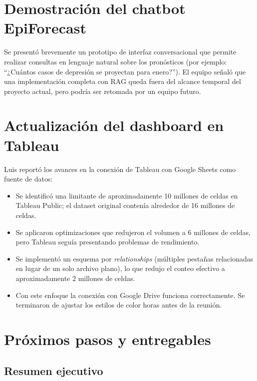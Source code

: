 \documentclass[11pt,letterpaper]{article}
\begin{document}
\section{Demostración del chatbot EpiForecast}

Se presentó brevemente un prototipo de interfaz conversacional que permite realizar consultas en lenguaje natural sobre los pronósticos (por ejemplo: ``¿Cuántos casos de depresión se proyectan para enero?''). El equipo señaló que una implementación completa con RAG queda fuera del alcance temporal del proyecto actual, pero podría ser retomada por un equipo futuro.

\section{Actualización del dashboard en Tableau}

Luis reportó los avances en la conexión de Tableau con Google Sheets como fuente de datos:

\begin{itemize}[leftmargin=1.5em]
    \item Se identificó una limitante de aproximadamente 10 millones de celdas en Tableau Public; el dataset original contenía alrededor de 16 millones de celdas.
    \item Se aplicaron optimizaciones que redujeron el volumen a 6 millones de celdas, pero Tableau seguía presentando problemas de rendimiento.
    \item Se implementó un esquema por \emph{relationships} (múltiples pestañas relacionadas en lugar de un solo archivo plano), lo que redujo el conteo efectivo a aproximadamente 2 millones de celdas.
    \item Con este enfoque la conexión con Google Drive funciona correctamente. Se terminaron de ajustar los estilos de color horas antes de la reunión.
\end{itemize}

\section{Próximos pasos y entregables}

\subsection{Resumen ejecutivo}
\end{document}
